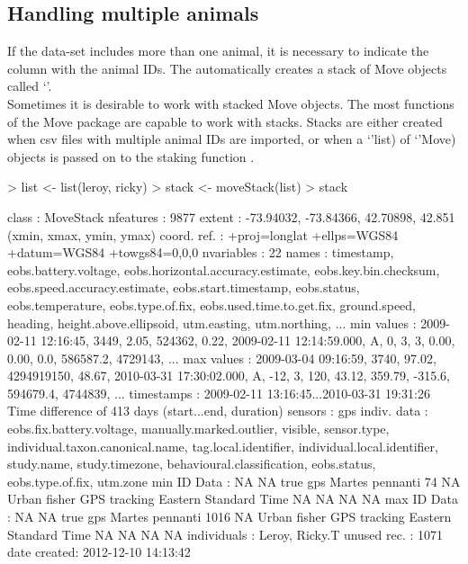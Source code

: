 \documentclass[article,nojss]{jss}
\newcommand{\fct}[1]{{\code{#1()}}}
\newcommand{\class}[1]{{`\code{#1}'}}
\begin{document}
\subsection{Handling multiple animals}
If the data-set includes more than one animal, it is necessary to indicate the column with the animal IDs. The \fct{move} automatically creates a stack of Move objects called \class{MoveStack}. \\
Sometimes it is desirable to work with stacked Move objects. The most functions of the Move package are capable to work with stacks. Stacks are either created when csv files with multiple animal IDs are imported, or when a \class(list) of \class(Move) objects is passed on to the staking function \fct{moveStack}.

\begin{Schunk}
\begin{Sinput}
> list <- list(leroy, ricky)
> stack <- moveStack(list)
> stack
\end{Sinput}
\begin{Soutput}
class       : MoveStack 
nfeatures   : 9877 
extent      : -73.94032, -73.84366, 42.70898, 42.851  (xmin, xmax, ymin, ymax)
coord. ref. : +proj=longlat +ellps=WGS84 +datum=WGS84 +towgs84=0,0,0 
nvariables  : 22
names       :           timestamp, eobs.battery.voltage, eobs.horizontal.accuracy.estimate, eobs.key.bin.checksum, eobs.speed.accuracy.estimate,    eobs.start.timestamp, eobs.status, eobs.temperature, eobs.type.of.fix, eobs.used.time.to.get.fix, ground.speed, heading, height.above.ellipsoid, utm.easting, utm.northing, ... 
min values  : 2009-02-11 12:16:45,                 3449,                              2.05,                524362,                         0.22, 2009-02-11 12:14:59.000,           A,                0,                3,                         3,         0.00,    0.00,                    0.0,    586587.2,      4729143, ... 
max values  : 2009-03-04 09:16:59,                 3740,                             97.02,            4294919150,                        48.67, 2010-03-31 17:30:02.000,           A,              -12,                3,                       120,        43.12,  359.79,                 -315.6,    594679.4,      4744839, ... 
timestamps  : 2009-02-11 13:16:45...2010-03-31 19:31:26 Time difference of 413 days  (start...end, duration) 
sensors     : gps 
indiv. data : eobs.fix.battery.voltage, manually.marked.outlier, visible, sensor.type, individual.taxon.canonical.name, tag.local.identifier, individual.local.identifier, study.name, study.timezone, behavioural.classification, eobs.status, eobs.type.of.fix, utm.zone 
min ID Data : NA NA true gps Martes pennanti   74 NA Urban fisher GPS tracking Eastern Standard Time NA NA NA NA 
max ID Data : NA NA true gps Martes pennanti 1016 NA Urban fisher GPS tracking Eastern Standard Time NA NA NA NA 
individuals : Leroy, Ricky.T 
unused rec. : 1071 
date created: 2012-12-10 14:13:42 
\end{Soutput}
\end{Schunk}
\end{document}
